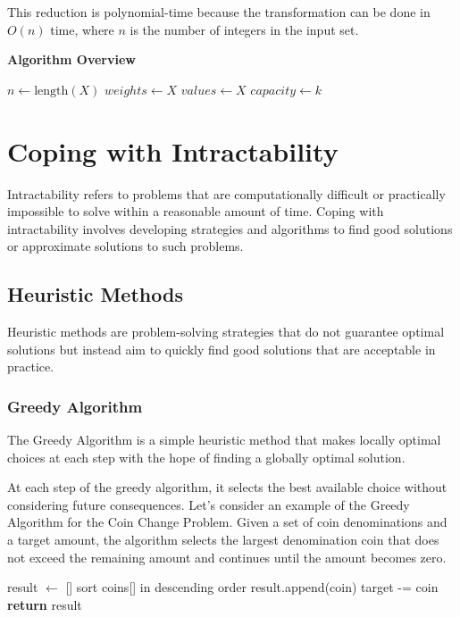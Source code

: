 This reduction is polynomial-time because the transformation can be done in \(O(n)\) time, where \(n\) is the number of integers in the input set.

\textbf{Algorithm Overview}
\FloatBarrier
\begin{algorithm}
\caption{Subset Sum to Knapsack Reduction}
\begin{algorithmic}[1]
    \State $n \gets \text{length}(X)$
    \State $weights \gets X$
    \State $values \gets X$
    \State $capacity \gets k$
    \State \Return {}
\EndFunction
\end{algorithmic}
\end{algorithm}
\FloatBarrier

\section{Coping with Intractability}

Intractability refers to problems that are computationally difficult or practically impossible to solve within a reasonable amount of time. Coping with intractability involves developing strategies and algorithms to find good solutions or approximate solutions to such problems.

\subsection{Heuristic Methods}

Heuristic methods are problem-solving strategies that do not guarantee optimal solutions but instead aim to quickly find good solutions that are acceptable in practice.

\subsubsection{Greedy Algorithm}

The Greedy Algorithm is a simple heuristic method that makes locally optimal choices at each step with the hope of finding a globally optimal solution.

At each step of the greedy algorithm, it selects the best available choice without considering future consequences. Let's consider an example of the Greedy Algorithm for the Coin Change Problem. Given a set of coin denominations and a target amount, the algorithm selects the largest denomination coin that does not exceed the remaining amount and continues until the amount becomes zero.
\FloatBarrier
\begin{algorithm}
\caption{Greedy Coin Change Algorithm}\label{greedy_coin_change}
\begin{algorithmic}[1]
\State result $\gets$ []
\State sort coins[] in descending order
        \State result.append(coin)
        \State target -= coin
    \EndWhile
\EndFor
\State \textbf{return} result
\EndProcedure
\end{algorithmic}
\end{algorithm}
\FloatBarrier


